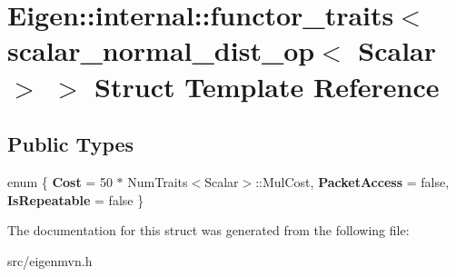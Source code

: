 \hypertarget{structEigen_1_1internal_1_1functor__traits_3_01scalar__normal__dist__op_3_01Scalar_01_4_01_4}{\section{Eigen\+:\+:internal\+:\+:functor\+\_\+traits$<$ scalar\+\_\+normal\+\_\+dist\+\_\+op$<$ Scalar $>$ $>$ Struct Template Reference}
\label{structEigen_1_1internal_1_1functor__traits_3_01scalar__normal__dist__op_3_01Scalar_01_4_01_4}
}
\subsection*{Public Types}
\begin{DoxyCompactItemize}
\item 
\hypertarget{structEigen_1_1internal_1_1functor__traits_3_01scalar__normal__dist__op_3_01Scalar_01_4_01_4_aa24d49756a42945135cf4bb233f70852}{enum \{ {\bfseries Cost} = 50 $\ast$ Num\+Traits$<$Scalar$>$\+:\+:Mul\+Cost, 
{\bfseries Packet\+Access} = false, 
{\bfseries Is\+Repeatable} = false
 \}}\label{structEigen_1_1internal_1_1functor__traits_3_01scalar__normal__dist__op_3_01Scalar_01_4_01_4_aa24d49756a42945135cf4bb233f70852}

\end{DoxyCompactItemize}


The documentation for this struct was generated from the following file\+:\begin{DoxyCompactItemize}
\item 
src/eigenmvn.\+h\end{DoxyCompactItemize}
